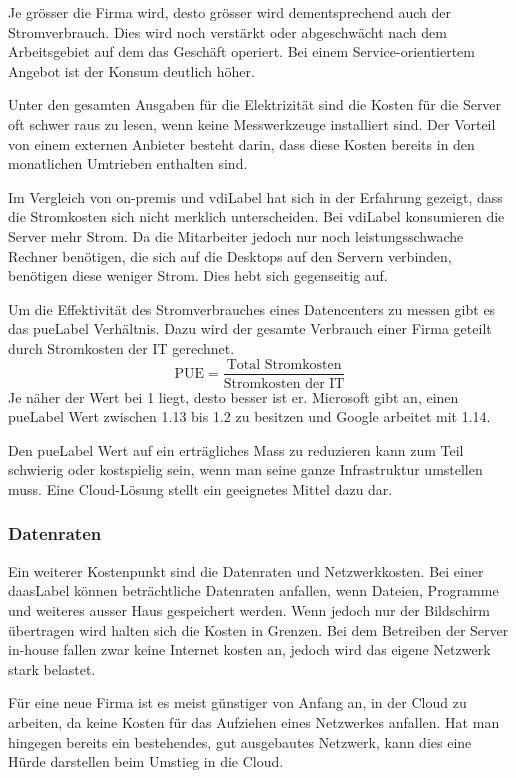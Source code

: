 Je grösser die Firma wird, desto grösser wird dementsprechend auch der Stromverbrauch. Dies wird noch verstärkt oder abgeschwächt nach dem Arbeitsgebiet auf dem das Geschäft operiert. Bei einem Service-orientiertem Angebot ist der Konsum deutlich höher.

Unter den gesamten Ausgaben für die Elektrizität sind die Kosten für die Server oft schwer raus zu lesen, wenn keine Messwerkzeuge installiert sind. Der Vorteil von einem externen Anbieter besteht darin, dass diese Kosten bereits in den monatlichen Umtrieben enthalten sind.

Im Vergleich von on-premis und \Gls{vdiLabel} hat sich in der Erfahrung gezeigt, dass die Stromkosten sich nicht merklich unterscheiden. Bei \Gls{vdiLabel} konsumieren die Server mehr Strom. Da die Mitarbeiter jedoch nur noch leistungsschwache Rechner benötigen, die sich auf die Desktops auf den Servern verbinden, benötigen diese weniger Strom. Dies hebt sich gegenseitig auf.

Um die Effektivität des Stromverbrauches eines Datencenters zu messen gibt es das \Gls{pueLabel} Verhältnis. Dazu wird der gesamte Verbrauch einer Firma geteilt durch Stromkosten der IT gerechnet.
\[\text{PUE} = \frac{\text{Total Stromkosten}}{\text{Stromkosten der IT}}\]
Je näher der Wert bei 1 liegt, desto besser ist er. Microsoft gibt an, einen \Gls{pueLabel} Wert zwischen 1.13 bis 1.2 zu besitzen und Google arbeitet mit 1.14.

Den \Gls{pueLabel} Wert auf ein erträgliches Mass zu reduzieren kann zum Teil schwierig oder kostspielig sein, wenn man seine ganze Infrastruktur umstellen muss. Eine Cloud-Lösung stellt ein geeignetes Mittel dazu dar.

\subsubsection{Datenraten}
Ein weiterer Kostenpunkt sind die Datenraten und Netzwerkkosten. Bei einer \Gls{daasLabel} können beträchtliche Datenraten anfallen, wenn Dateien, Programme und weiteres ausser Haus gespeichert werden. Wenn jedoch nur der Bildschirm übertragen wird halten sich die Kosten in Grenzen. Bei dem Betreiben der Server in-house fallen zwar keine Internet kosten an, jedoch wird das eigene Netzwerk stark belastet.

Für eine neue Firma ist es meist günstiger von Anfang an, in der Cloud zu arbeiten, da keine Kosten für das Aufziehen eines Netzwerkes anfallen.
Hat man hingegen bereits ein bestehendes, gut ausgebautes Netzwerk, kann dies eine Hürde darstellen beim Umstieg in die Cloud.

